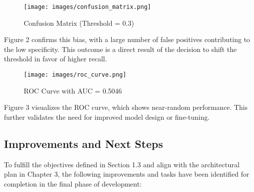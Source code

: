 \documentclass[12pt]{article}
\begin{document}
\begin{figure}[H]
\centering
\texttt{[image: images/confusion\_matrix.png]}
\caption{Confusion Matrix (Threshold = 0.3)}
\end{figure}
Figure 2 confirms this bias, with a large number of false positives contributing to the low specificity. This outcome is a direct result of the decision to shift the threshold in favor of higher recall.

\begin{figure}[H]
\centering
\texttt{[image: images/roc\_curve.png]}
\caption{ROC Curve with AUC = 0.5046}
\end{figure}
Figure 3 visualizes the ROC curve, which shows near-random performance. This further validates the need for improved model design or fine-tuning.

\subsection{Improvements and Next Steps}
To fulfill the objectives defined in Section 1.3 and align with the architectural plan in Chapter 3, the following improvements and tasks have been identified for completion in the final phase of development:
\end{document}
